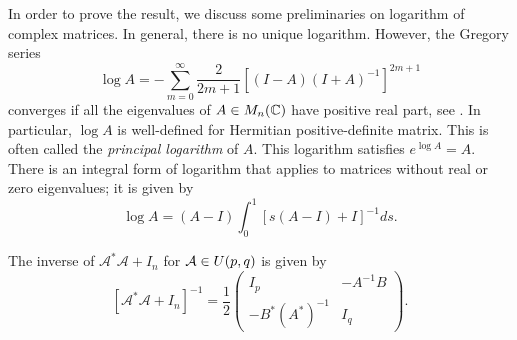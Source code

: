 \vspace{0.3cm}
\noindent In order to prove the result, we discuss some preliminaries on logarithm of complex matrices. In general, there is no unique logarithm. However, the Gregory series 
\begin{displaymath}
    \log A=-\sum_{m=0}^{\infty}\frac{2}{2m+1}\left[(I-A)(I+A)^{-1}\right]^{2m+1}
\end{displaymath}
converges if all the eigenvalues of $A\in M_n(\mathbb{C})$ have positive real part, see \cite[\S 11.3, page 273]{Hig08}. In particular, $\log A$ is well-defined for Hermitian positive-definite matrix. This is often called the \textit{principal logarithm} of $A$. This logarithm satisfies $e^{\log A}=A$. There is an integral form of logarithm that applies to matrices without real or zero eigenvalues; it is given by
\begin{displaymath}
    \log A =(A-I)\int_0^1 \left[s(A-I)+I\right]^{-1}ds.
\end{displaymath}
\begin{lemma}\label{inv}
    The inverse of $\mathcal{A}^\ast\mathcal{A}+I_n$ for $\mathcal{A}\in U(p,q)$ is given by
    \begin{displaymath}
        \left[\mathcal{A}^\ast\mathcal{A}+I_n\right]^{-1}=\frac{1}{2}\left(\begin{array}{cc}
        I_p & -A^{-1}B\\
        -B^\ast (A^\ast)^{-1} & I_q
        \end{array}\right).
    \end{displaymath}
\end{lemma}
